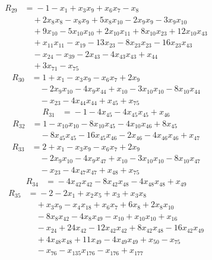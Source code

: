 \begin{align*}
R_{29}&={}-1 -x_{1} +x_{3}x_{9} +x_{6}x_{7} -x_{8}\\
&\quad{}+2x_{8}x_{8} -x_{8}x_{9} +5x_{8}x_{10} -2x_{9}x_{9} -3x_{9}x_{10}\\
&\quad{}+9x_{10} -5x_{10}x_{10} +2x_{10}x_{11} +8x_{10}x_{23} +12x_{10}x_{43}\\
&\quad{}+x_{11}x_{11} -x_{19} -13x_{23} -8x_{23}x_{23} -16x_{23}x_{43}\\
&\quad{}-x_{24} -x_{39} -2x_{43} -4x_{43}x_{43} +x_{44}\\
&\quad{}+3x_{71} -x_{75}
\end{align*}
\begin{align*}
R_{30}&={}1 +x_{1} -x_{3}x_{9} -x_{6}x_{7} +2x_{9}\\
&\quad{}-2x_{9}x_{10} -4x_{9}x_{44} +x_{10} -3x_{10}x_{10} -8x_{10}x_{44}\\
&\quad{}-x_{23} -4x_{44}x_{44} +x_{45} +x_{75}
\end{align*}
\begin{align*}
R_{31}&={}-1 -4x_{45} -4x_{45}x_{45} +x_{46}
\end{align*}
\begin{align*}
R_{32}&={}1 -x_{10}x_{10} -8x_{10}x_{45} -4x_{10}x_{46} +8x_{45}\\
&\quad{}-8x_{45}x_{45} -16x_{45}x_{46} -2x_{46} -4x_{46}x_{46} +x_{47}
\end{align*}
\begin{align*}
R_{33}&={}2 +x_{1} -x_{3}x_{9} -x_{6}x_{7} +2x_{9}\\
&\quad{}-2x_{9}x_{10} -4x_{9}x_{47} +x_{10} -3x_{10}x_{10} -8x_{10}x_{47}\\
&\quad{}-x_{23} -4x_{47}x_{47} +x_{48} +x_{75}
\end{align*}
\begin{align*}
R_{34}&={}-4x_{42}x_{42} -8x_{42}x_{48} -4x_{48}x_{48} +x_{49}
\end{align*}
\begin{align*}
R_{35}&={}-2 -2x_{1} +x_{2}x_{5} +x_{3} +x_{3}x_{8}\\
&\quad{}+x_{3}x_{9} -x_{4}x_{18} +x_{6}x_{7} +6x_{8} +2x_{8}x_{10}\\
&\quad{}-8x_{8}x_{42} -4x_{8}x_{49} -x_{10} +x_{10}x_{10} +x_{16}\\
&\quad{}-x_{24} +24x_{42} -12x_{42}x_{42} +8x_{42}x_{48} -16x_{42}x_{49}\\
&\quad{}+4x_{48}x_{48} +11x_{49} -4x_{49}x_{49} +x_{50} -x_{75}\\
&\quad{}-x_{76} -x_{135}x_{176} -x_{176} +x_{177}
\end{align*}
